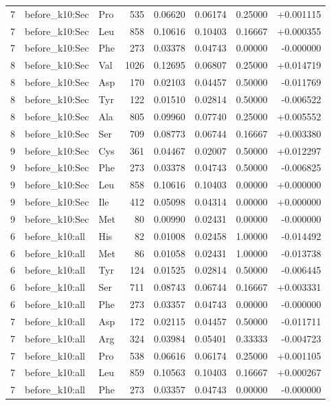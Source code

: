 \begin{longtable}{r l l r r r r r}
7 & before\_k10:Sec & Pro & 535 & 0.06620 & 0.06174 & 0.25000 & +0.001115 \\
7 & before\_k10:Sec & Leu & 858 & 0.10616 & 0.10403 & 0.16667 & +0.000355 \\
7 & before\_k10:Sec & Phe & 273 & 0.03378 & 0.04743 & 0.00000 & -0.000000 \\
8 & before\_k10:Sec & Val & 1026 & 0.12695 & 0.06807 & 0.25000 & +0.014719 \\
8 & before\_k10:Sec & Asp & 170 & 0.02103 & 0.04457 & 0.50000 & -0.011769 \\
8 & before\_k10:Sec & Tyr & 122 & 0.01510 & 0.02814 & 0.50000 & -0.006522 \\
8 & before\_k10:Sec & Ala & 805 & 0.09960 & 0.07740 & 0.25000 & +0.005552 \\
8 & before\_k10:Sec & Ser & 709 & 0.08773 & 0.06744 & 0.16667 & +0.003380 \\
9 & before\_k10:Sec & Cys & 361 & 0.04467 & 0.02007 & 0.50000 & +0.012297 \\
9 & before\_k10:Sec & Phe & 273 & 0.03378 & 0.04743 & 0.50000 & -0.006825 \\
9 & before\_k10:Sec & Leu & 858 & 0.10616 & 0.10403 & 0.00000 & +0.000000 \\
9 & before\_k10:Sec & Ile & 412 & 0.05098 & 0.04314 & 0.00000 & +0.000000 \\
9 & before\_k10:Sec & Met & 80 & 0.00990 & 0.02431 & 0.00000 & -0.000000 \\
6 & before\_k10:all & His & 82 & 0.01008 & 0.02458 & 1.00000 & -0.014492 \\
6 & before\_k10:all & Met & 86 & 0.01058 & 0.02431 & 1.00000 & -0.013738 \\
6 & before\_k10:all & Tyr & 124 & 0.01525 & 0.02814 & 0.50000 & -0.006445 \\
6 & before\_k10:all & Ser & 711 & 0.08743 & 0.06744 & 0.16667 & +0.003331 \\
6 & before\_k10:all & Phe & 273 & 0.03357 & 0.04743 & 0.00000 & -0.000000 \\
7 & before\_k10:all & Asp & 172 & 0.02115 & 0.04457 & 0.50000 & -0.011711 \\
7 & before\_k10:all & Arg & 324 & 0.03984 & 0.05401 & 0.33333 & -0.004723 \\
7 & before\_k10:all & Pro & 538 & 0.06616 & 0.06174 & 0.25000 & +0.001105 \\
7 & before\_k10:all & Leu & 859 & 0.10563 & 0.10403 & 0.16667 & +0.000267 \\
7 & before\_k10:all & Phe & 273 & 0.03357 & 0.04743 & 0.00000 & -0.000000 \\

\end{longtable}
